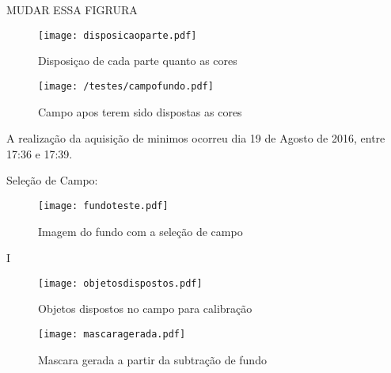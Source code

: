 MUDAR ESSA FIGRURA
\begin{figure}[H]
\begin{minipage}[b]{0.45\linewidth}
\centering
\texttt{[image: disposicaoparte.pdf]}
\caption{Disposiçao de cada parte quanto as cores}
\label{fig:figure1}
\end{minipage}
\hspace{0.5cm}
\begin{minipage}[b]{0.45\linewidth}
\centering
\texttt{[image: /testes/campofundo.pdf]}
\caption{Campo apos terem sido dispostas as cores}
\label{fig:figure2}
\end{minipage}
\end{figure}

	
A realização da aquisição de minimos ocorreu dia 19 de Agosto de 2016, entre 17:36 e 17:39.

Seleção de Campo:
\begin{figure}[H]
		\centering
		\texttt{[image: fundoteste.pdf]}
		\caption{Imagem do fundo com a seleção de campo}
		\label{disposicaoparte}
	\end{figure}
	
I%
	
	\begin{figure}[H]
\begin{minipage}[H]{0.34\linewidth}
\centering
\texttt{[image: objetosdispostos.pdf]}
\caption{Objetos dispostos no campo para calibração}
\label{fig:figure1}
\end{minipage}
\hspace{0.5cm}
\begin{minipage}[H]{0.40\linewidth}
\centering
\texttt{[image: mascaragerada.pdf]}
\caption{Mascara gerada a partir da subtração de fundo}
\label{fig:figure2}
\end{minipage}
\end{figure}	
	
